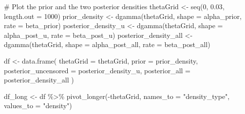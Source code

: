 \documentclass[
  letterpaper,
  DIV=11,
  numbers=noendperiod]{scrartcl}
\newenvironment{Shaded}{\begin{snugshade}}{\end{snugshade}}
\newcommand{\AttributeTok}[1]{\textcolor[rgb]{0.40,0.45,0.13}{#1}}
\newcommand{\CommentTok}[1]{\textcolor[rgb]{0.37,0.37,0.37}{#1}}
\newcommand{\DecValTok}[1]{\textcolor[rgb]{0.68,0.00,0.00}{#1}}
\newcommand{\FloatTok}[1]{\textcolor[rgb]{0.68,0.00,0.00}{#1}}
\newcommand{\FunctionTok}[1]{\textcolor[rgb]{0.28,0.35,0.67}{#1}}
\newcommand{\NormalTok}[1]{\textcolor[rgb]{0.00,0.23,0.31}{#1}}
\newcommand{\OtherTok}[1]{\textcolor[rgb]{0.00,0.23,0.31}{#1}}
\newcommand{\SpecialCharTok}[1]{\textcolor[rgb]{0.37,0.37,0.37}{#1}}
\newcommand{\StringTok}[1]{\textcolor[rgb]{0.13,0.47,0.30}{#1}}
\begin{document}
\begin{tcolorbox}
\begin{Shaded}
\end{Shaded}

\begin{Shaded}
\begin{Highlighting}[]
\CommentTok{\# Plot the prior and the two posterior densities }
\NormalTok{thetaGrid }\OtherTok{\textless{}{-}} \FunctionTok{seq}\NormalTok{(}\DecValTok{0}\NormalTok{, }\FloatTok{0.03}\NormalTok{, }\AttributeTok{length.out =} \DecValTok{1000}\NormalTok{)}
\NormalTok{prior\_density }\OtherTok{\textless{}{-}} \FunctionTok{dgamma}\NormalTok{(thetaGrid, }\AttributeTok{shape =}\NormalTok{ alpha\_prior, }\AttributeTok{rate =}\NormalTok{ beta\_prior)}
\NormalTok{posterior\_density\_u }\OtherTok{\textless{}{-}} \FunctionTok{dgamma}\NormalTok{(thetaGrid, }\AttributeTok{shape =}\NormalTok{ alpha\_post\_u, }\AttributeTok{rate =}\NormalTok{ beta\_post\_u)}
\NormalTok{posterior\_density\_all }\OtherTok{\textless{}{-}} \FunctionTok{dgamma}\NormalTok{(thetaGrid, }\AttributeTok{shape =}\NormalTok{ alpha\_post\_all, }\AttributeTok{rate =}\NormalTok{ beta\_post\_all)}


\NormalTok{df }\OtherTok{\textless{}{-}} \FunctionTok{data.frame}\NormalTok{(}
  \AttributeTok{thetaGrid =}\NormalTok{ thetaGrid, }
  \AttributeTok{prior =}\NormalTok{ prior\_density, }
  \AttributeTok{posterior\_uncensored =}\NormalTok{ posterior\_density\_u,}
  \AttributeTok{posterior\_all =}\NormalTok{ posterior\_density\_all}
\NormalTok{)}

\NormalTok{df\_long }\OtherTok{\textless{}{-}}\NormalTok{ df }\SpecialCharTok{\%\textgreater{}\%} \FunctionTok{pivot\_longer}\NormalTok{(}\SpecialCharTok{{-}}\NormalTok{thetaGrid, }\AttributeTok{names\_to =} \StringTok{"density\_type"}\NormalTok{, }\AttributeTok{values\_to =} \StringTok{"density"}\NormalTok{)}


\end{Highlighting}
\end{Shaded}
\end{tcolorbox}
\end{document}
